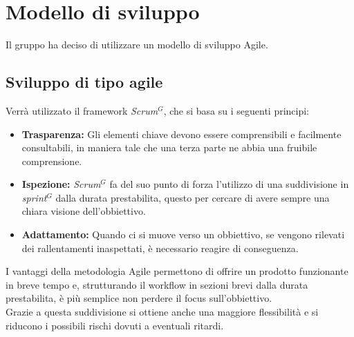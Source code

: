 \section{Modello di sviluppo}
Il gruppo ha deciso di utilizzare un modello di sviluppo Agile.

\subsection {Sviluppo di tipo agile}
Verrà utilizzato il framework \textit{Scrum}$^{G}$, che si basa su i seguenti principi:
\begin{itemize}
    \item \textbf{Trasparenza:} Gli elementi chiave devono essere comprensibili e facilmente consultabili, in maniera tale che una terza parte ne abbia una fruibile comprensione.
    
    \item \textbf{Ispezione:} \textit{Scrum}$^{G}$ fa del suo punto di forza l'utilizzo di una suddivisione in \textit{sprint}$^{G}$ dalla durata prestabilita, questo per cercare di avere sempre una chiara visione dell'obbiettivo.
    
    \item \textbf{Adattamento:} Quando ci si muove verso un obbiettivo, se vengono rilevati dei rallentamenti inaspettati, è necessario reagire di conseguenza.
\end{itemize}
I vantaggi della metodologia Agile permettono di offrire un prodotto funzionante in breve tempo e, strutturando il workflow in sezioni brevi dalla durata prestabilita, è più semplice non perdere il focus sull'obbiettivo. \\
Grazie a questa suddivisione si ottiene anche una maggiore flessibilità e si riducono i possibili rischi dovuti a eventuali ritardi.